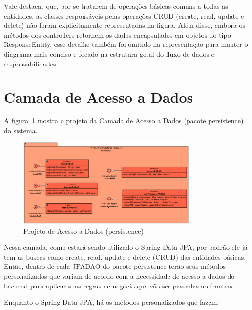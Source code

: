 Vale destacar que, por se tratarem de operações básicas comuns a todas as entidades, as classes responsáveis pelas operações CRUD (\textsf{create, read, update e delete}) não foram explicitamente representadas na figura. Além disso, embora os métodos dos \textsf{controllers} retornem os dados encapsulados em objetos do tipo \textsf{ResponseEntity}, esse detalhe também foi omitido na representação para manter o diagrama mais conciso e focado na estrutura geral do fluxo de dados e responsabilidades.

\section{Camada de Acesso a Dados}
\label{sec-frameweb-dados}


A figura~\ref{persistence} mostra o projeto da Camada de Acesso a Dados (pacote \textsf{persistence}) do sistema.

\begin{figure}[h]
	\centering
	\includegraphics[width=0.8\textwidth]{figuras/persistence.png}
	\caption{Projeto de Acesso a Dados (\textsf{persistence})}
	\label{persistence}
\end{figure}

Nessa camada, como estará sendo utilizado o \textsf{Spring Data JPA}, por padrão ele já tem as buscas como create, read, update e delete (CRUD) das entidades básicas. Então, dentro de cada JPADAO do pacote \textsf{persistence} terão seus métodos personalizados que variam de acordo com a necessidade de acesso a dados do backend para aplicar suas regras de negócio que vão ser passadas ao \textsf{frontend}.

Enquanto o \textsf{Spring Data JPA}, há os métodos personalizados que fazem:

